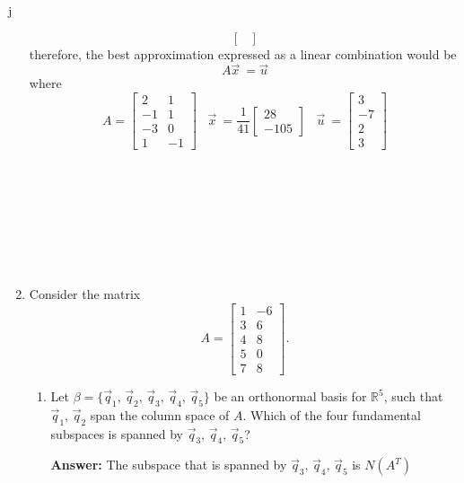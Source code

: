 j\documentclass[12pt]{article}
\begin{document}
\begin{enumerate}
\[\begin{bmatrix}
\end{bmatrix}
\]
therefore, the best approximation expressed as a linear combination would be
\[
A\vec x\ = \vec{u}
\]
where
\[
A = \begin{bmatrix}
    2&1\\
    -1&1\\
    -3&0\\
    1&-1
\end{bmatrix}
\;\;\;
\vec x\ = 
\frac{1}{41}
\begin{bmatrix}
    28\\-105
\end{bmatrix}
\;\;\;
\vec u\ = 
\begin{bmatrix}
    3\\-7\\2\\3
\end{bmatrix}
\]
\\ \\ \\ \\ \\ \\ \\ 



 

	\item  Consider the matrix 
	\[ A = \begin{bmatrix} 1&-6\\3&6\\4&8\\5&0\\7&8\end{bmatrix}. \]
	\begin{enumerate} 
		\item  Let $\beta = \{\vec q_1, \, \vec q_2, \, \vec q_3, \, \vec q_4, \, \vec q_5\}$ be an orthonormal basis for $\mathbb{R}^5$, such that $\vec q_1, \, \vec q_2$ span the column space of $A$. Which of the four fundamental subspaces is spanned by $\vec q_3, \, \vec q_4, \, \vec q_5$?

        \textbf{Answer: }The subspace that is spanned by $\vec q_3, \, \vec q_4, \, \vec q_5$ is $N(A^T)$
\newline
    

\end{enumerate}
\end{enumerate}
\end{document}
